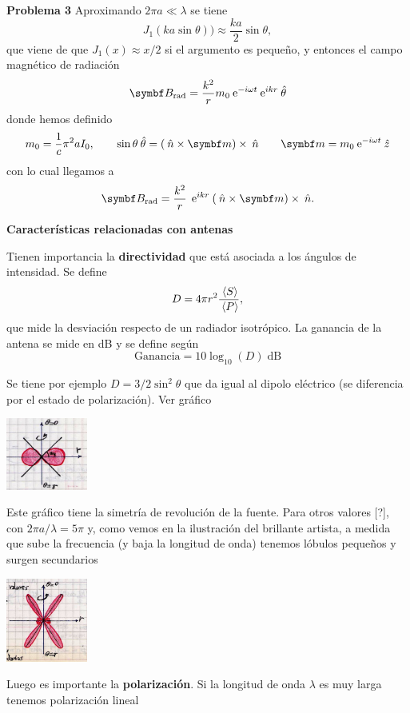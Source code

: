 \documentclass[10pt,oneside]{CBFT_book}
\begin{document}
\begin{ejemplo}{\bf Problema 3}
Aproximando $ 2 \pi a \ll \lambda $ se tiene
\[
	J_1(ka\sin\theta)) \approx \frac{ka}{2} \sin\theta,
\]
que viene de que $J_1(x)\approx x/2$ si el argumento es pequeño, y entonces el campo magnético
de radiación
\[
	\vb B_{\text{rad}} = \frac{k^2}{r} m_0 \euler^{-i\omega t} \euler^{ikr} \thetaver
\]
donde hemos definido
\[
	m_0 = \frac{1}{c}\pi^2 a I_0, \qquad \sin\theta\thetaver = (\nver\times\vb m)\times\nver
	\qquad \vb m = m_0\euler^{-i\omega t}\zver
\]
con lo cual llegamos a
\[
	\vb B_{\text{rad}} = \frac{k^2}{r} \: \euler^{ikr} \: (\nver\times\vb m)\times\nver.
\]

\end{ejemplo}

\begin{notas}{\bf Características relacionadas con antenas}
 
Tienen importancia la {\bf directividad} que está asociada a los ángulos de intensidad.
Se define
\[
	D = 4\pi r^2 \frac{\:\left\langle S \right\rangle}{\:\left\langle P \right\rangle},
\]
que mide la desviación respecto de un radiador isotrópico. La ganancia de la antena se mide
en dB y se define según
\[
	\text{Ganancia} = 10 \log_{10}(D) \; \text{dB}
\]

Se tiene por ejemplo $D=3/2 \sin^2\theta$ que da igual al dipolo eléctrico (se diferencia
por el estado de polarización). Ver gráfico

\includegraphics[width=0.2\textwidth]{images/fig_ft1_direct_antena_1.jpg}

Este gráfico tiene la simetría de revolución de la fuente.
Para otros valores [?], con $2\pi a/\lambda = 5\pi$ y, como vemos en la ilustración del
brillante artista, a medida que sube la frecuencia (y baja la longitud de onda) tenemos
lóbulos pequeños y surgen secundarios
 
\includegraphics[width=0.2\textwidth]{images/fig_ft1_direct_antena_2.jpg}

Luego es importante la {\bf polarización}. Si la longitud de onda $\lambda$ es muy larga
tenemos polarización lineal


\end{notas}
\end{document}
